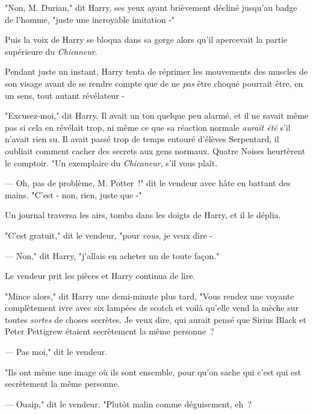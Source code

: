 "Non, M. Durian," dit Harry, ses yeux ayant brièvement décliné jusqu'au badge de l'homme, "juste une incroyable imitation -"

Puis la voix de Harry se bloqua dans sa gorge alors qu'il apercevait la partie supérieure du \emph{Chicaneur}.

Pendant juste un instant, Harry tenta de réprimer les mouvements des muscles de son visage avant de se rendre compte que de ne \emph{pas} être choqué pourrait être, en un sens, tout autant révélateur -

"Excusez-moi," dit Harry. Il avait un ton quelque peu alarmé, et il ne savait même pas si cela en révélait trop, ni même ce que sa réaction normale \emph{aurait été} s'il n'avait rien su. Il avait passé trop de temps entouré d'élèves Serpentard, il oubliait comment cacher des secrets aux gens normaux. Quatre Noises heurtèrent le comptoir. "Un exemplaire du \emph{Chicaneur}, s'il vous plaît.

--- Oh, pas de problème, M. Potter~!" dit le vendeur avec hâte en battant des mains. "C'est - non, rien, juste que -"

Un journal traversa les airs, tomba dans les doigts de Harry, et il le déplia.


"C'est gratuit," dit le vendeur, "pour \emph{vous}, je veux dire -

--- Non," dit Harry, "j'allais en acheter un de toute façon."

Le vendeur prit les pièces et Harry continua de lire.

"Mince alors," dit Harry une demi-minute plus tard, "Vous rendez une voyante complètement ivre avec six lampées de scotch et voilà qu'elle vend la mèche sur toutes \emph{sortes} de choses secrètes. Je veux dire, qui aurait pensé que Sirius Black et Peter Pettigrew étaient secrètement la même personne~?

--- Pas moi," dit le vendeur.

"Ils ont même une image où ils sont ensemble, pour qu'on sache qui c'est qui est secrètement la même personne.

--- Ouaip," dit le vendeur. "Plutôt malin comme déguisement, eh~?

